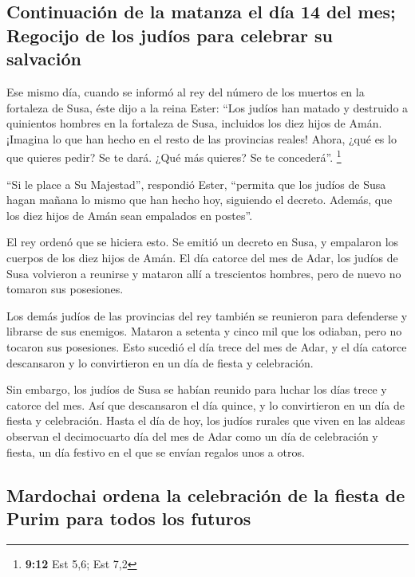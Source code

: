 \hypertarget{continuaciuxf3n-de-la-matanza-el-duxeda-14-del-mes-regocijo-de-los-juduxedos-para-celebrar-su-salvaciuxf3n}{%
\subsection{Continuación de la matanza el día 14 del mes; Regocijo de
los judíos para celebrar su
salvación}\label{continuaciuxf3n-de-la-matanza-el-duxeda-14-del-mes-regocijo-de-los-juduxedos-para-celebrar-su-salvaciuxf3n}}

 Ese mismo día, cuando se informó al rey del número de
los muertos en la fortaleza de Susa,  éste dijo a la
reina Ester: ``Los judíos han matado y destruido a quinientos hombres en
la fortaleza de Susa, incluidos los diez hijos de Amán. ¡Imagina lo que
han hecho en el resto de las provincias reales! Ahora, ¿qué es lo que
quieres pedir? Se te dará. ¿Qué más quieres? Se te concederá''.
\footnote{\textbf{9:12} Est 5,6; Est 7,2}

 ``Si le place a Su Majestad'', respondió Ester,
``permita que los judíos de Susa hagan mañana lo mismo que han hecho
hoy, siguiendo el decreto. Además, que los diez hijos de Amán sean
empalados en postes''.

 El rey ordenó que se hiciera esto. Se emitió un decreto
en Susa, y empalaron los cuerpos de los diez hijos de Amán.
 El día catorce del mes de Adar, los judíos de Susa
volvieron a reunirse y mataron allí a trescientos hombres, pero de nuevo
no tomaron sus posesiones.

 Los demás judíos de las provincias del rey también se
reunieron para defenderse y librarse de sus enemigos. Mataron a setenta
y cinco mil que los odiaban, pero no tocaron sus posesiones.
 Esto sucedió el día trece del mes de Adar, y el día
catorce descansaron y lo convirtieron en un día de fiesta y celebración.

 Sin embargo, los judíos de Susa se habían reunido para
luchar los días trece y catorce del mes. Así que descansaron el día
quince, y lo convirtieron en un día de fiesta y celebración.
 Hasta el día de hoy, los judíos rurales que viven en las
aldeas observan el decimocuarto día del mes de Adar como un día de
celebración y fiesta, un día festivo en el que se envían regalos unos a
otros.

\hypertarget{mardochai-ordena-la-celebraciuxf3n-de-la-fiesta-de-purim-para-todos-los-futuros}{%
\subsection{Mardochai ordena la celebración de la fiesta de Purim para
todos los
futuros}\label{mardochai-ordena-la-celebraciuxf3n-de-la-fiesta-de-purim-para-todos-los-futuros}}


